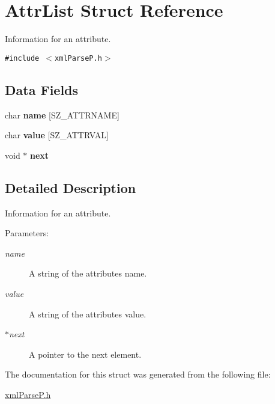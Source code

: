 \hypertarget{structAttrList}{
\section{AttrList Struct Reference}
\label{structAttrList}
}
Information for an attribute.  


{\tt \#include $<$xmlParseP.h$>$}

\subsection*{Data Fields}
\begin{CompactItemize}
\item 
\hypertarget{structAttrList_217caa5e66c48a418c5e9d8d9b24db50}{
char \textbf{name} \mbox{[}SZ\_\-ATTRNAME\mbox{]}}
\label{structAttrList_217caa5e66c48a418c5e9d8d9b24db50}

\item 
\hypertarget{structAttrList_b05ba979e02ca5a2670e574b3571d0d6}{
char \textbf{value} \mbox{[}SZ\_\-ATTRVAL\mbox{]}}
\label{structAttrList_b05ba979e02ca5a2670e574b3571d0d6}

\item 
\hypertarget{structAttrList_2fbe1489ab80694a08f160a359faaf8f}{
void $\ast$ \textbf{next}}
\label{structAttrList_2fbe1489ab80694a08f160a359faaf8f}

\end{CompactItemize}


\subsection{Detailed Description}
Information for an attribute. 

\begin{Desc}
\item[Parameters:]
\begin{description}
\item[{\em name}]A string of the attributes name. \item[{\em value}]A string of the attributes value. \item[{\em $\ast$next}]A pointer to the next element. \end{description}
\end{Desc}


The documentation for this struct was generated from the following file:\begin{CompactItemize}
\item 
\hyperlink{xmlParseP_8h}{xmlParseP.h}\end{CompactItemize}
